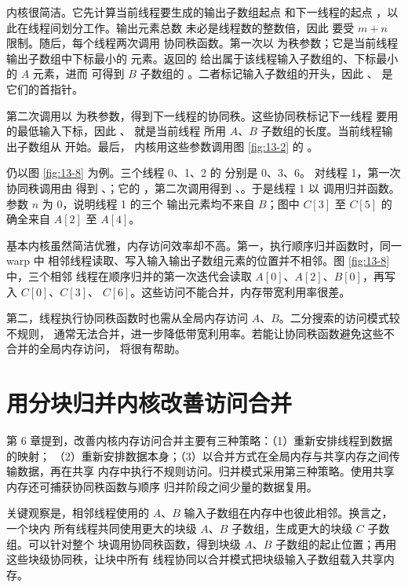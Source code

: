 内核很简洁。它先计算当前线程要生成的输出子数组起点 
 和下一线程的起点 ，以此在线程间划分工作。输出元素总数
未必是线程数的整数倍，因此  要受 $m+n$ 限制。随后，每个线程两次调用
协同秩函数。第一次以  为秩参数；它是当前线程输出子数组中下标最小的
元素。返回的  给出属于该线程输入子数组的、下标最小的 $A$ 元素，进而
可得到 $B$ 子数组的 。二者标记输入子数组的开头，因此
、 是它们的首指针。

第二次调用以  为秩参数，得到下一线程的协同秩。这些协同秩标记下一线程
要用的最低输入下标，因此 、 就是当前线程
所用 $A$、$B$ 子数组的长度。当前线程输出子数组从  开始。最后，
内核用这些参数调用图 \ref{fig:13-2} 的 。

仍以图 \ref{fig:13-8} 为例。三个线程 0、1、2 的  分别是 0、3、6。
对线程 1，第一次协同秩调用由  得到
、；它的 ，第二次调用得到
、。于是线程 1 以
 调用归并函数。参数 $n$ 为 0，说明线程 1 的三个
输出元素均不来自 $B$；图中 $C[3]$ 至 $C[5]$ 的确全来自 $A[2]$ 至 $A[4]$。

基本内核虽然简洁优雅，内存访问效率却不高。第一，执行顺序归并函数时，同一 warp 中
相邻线程读取、写入输入输出子数组元素的位置并不相邻。图 \ref{fig:13-8} 中，三个相邻
线程在顺序归并的第一次迭代会读取 $A[0]$、$A[2]$、$B[0]$，再写入 $C[0]$、$C[3]$、
$C[6]$。这些访问不能合并，内存带宽利用率很差。

第二，线程执行协同秩函数时也需从全局内存访问 $A$、$B$。二分搜索的访问模式较不规则，
通常无法合并，进一步降低带宽利用率。若能让协同秩函数避免这些不合并的全局内存访问，
将很有帮助。

\section{用分块归并内核改善访问合并}
\label{sec:tiled-merge}

第 6 章提到，改善内核内存访问合并主要有三种策略：（1）重新安排线程到数据的映射；
（2）重新安排数据本身；（3）以合并方式在全局内存与共享内存之间传输数据，再在共享
内存中执行不规则访问。归并模式采用第三种策略。使用共享内存还可捕获协同秩函数与顺序
归并阶段之间少量的数据复用。

关键观察是，相邻线程使用的 $A$、$B$ 输入子数组在内存中也彼此相邻。换言之，一个块内
所有线程共同使用更大的块级 $A$、$B$ 子数组，生成更大的块级 $C$ 子数组。可以针对整个
块调用协同秩函数，得到块级 $A$、$B$ 子数组的起止位置；再用这些块级协同秩，让块中所有
线程协同以合并模式把块级输入子数组载入共享内存。

